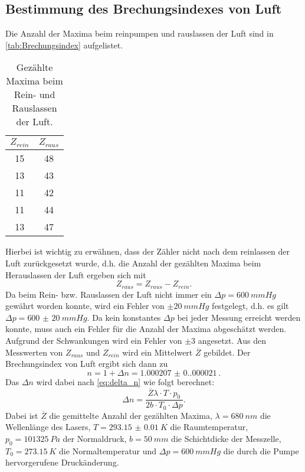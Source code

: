 \subsection{Bestimmung des Brechungsindexes von Luft}
Die Anzahl der Maxima beim reinpumpen und rauslassen der Luft sind in \autoref{tab:Brechungsindex} aufgelistet.
\begin{table}[H]
  \centering
  \caption{Gezählte Maxima beim Rein- und Rauslassen der Luft.}
  \begin{tabular}{c c}
      \toprule
      $Z_{rein}$ & $Z_{raus}$\\
      \midrule
      15 & 48\\
      13 & 43\\
      11 & 42\\
      11 & 44\\
      13 & 47\\
      \bottomrule
  \end{tabular}
  \label{tab:wellenleange}
\end{table}
Hierbei ist wichtig zu erwähnen, dass der Zähler nicht nach dem reinlassen der Luft zurückgesetzt wurde, d.h. die Anzahl der gezählten Maxima beim Herauslassen der Luft
ergeben sich mit
\begin{equation*}
  Z_{raus} = Z_{raus} - Z_{rein}.
\end{equation*}
Da beim Rein- bzw. Rauslassen der Luft nicht immer ein $\Delta p = \SI{600}{mmHg}$ gewährt worden konnte, wird ein Fehler von $\pm \SI{20}{mmHg}$ festgelegt, d.h. es gilt 
$\Delta p = \SI{600(20)}{mmHg}$.
Da kein konstantes $\Delta p$ bei jeder Messung erreicht werden konnte, muss auch ein Fehler für die Anzahl der Maxima abgeschätzt werden. Aufgrund der Schwankungen
wird ein Fehler von $\pm 3$ angesetzt.
Aus den Messwerten von $Z_{raus}$ und $Z_{rein}$ wird ein Mittelwert $\overline{Z}$ gebildet. Der Brechungsindex von Luft ergibt sich dann zu
\begin{equation*}
  n = 1 + \Delta n = \SI{1.000207(0.000021)}{}.
\end{equation*}
Das $\Delta n$ wird dabei nach \autoref{eq:delta_n} wie folgt berechnet:
\begin{equation*}
  \Delta n = \frac{\overline{Z}\lambda \cdot T \cdot p_0}{2b \cdot T_0 \cdot \Delta p}.
\end{equation*}
Dabei ist $\overline{Z}$ die gemittelte Anzahl der gezählten Maxima, $\lambda = \SI{680}{nm}$ die Wellenlänge des Lasers, $T = \SI{293.15(1)}{K}$ die Raumtemperatur,
$p_0 = \SI{101325}{Pa}$ \cite{p_normal} der Normaldruck, $b = \SI{50}{mm}$ die Schichtdicke der Messzelle, $T_0 = \SI{273.15}{K}$ die Normaltemperatur und $\Delta p = \SI{600}{mmHg}$
die durch die Pumpe hervorgerufene Druckänderung.
